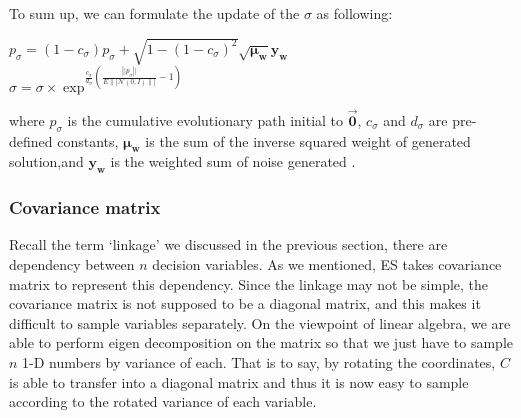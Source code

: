  To sum up, we can formulate the update of the $\sigma$ as following:\\
  \begin{center} {\large $p_{\sigma} =
    (1-c_{\sigma})p_{\sigma}+\sqrt{1-{\left(
      1-c_{\sigma}\right)}^2}\sqrt{\mathbf{\mu_w}}\mathbf{y_w}$\\
      $\sigma = \sigma \times \exp^{ \frac{c_{\sigma}}{d_{\sigma}}
      \left(\frac{\left|| p_{\sigma} \right||}{
        E\||{\mathcal{N}(0,I)}\||} -1 \right)  }$\\ } \end{center} where
      $p_{\sigma}$ is the cumulative evolutionary path initial to
      $\vec{\textbf{0}}$, $c_{\sigma}$ and $d_{\sigma}$ are pre-defined
      constants, $\mathbf{\mu_w}$ is the sum of the inverse squared
      weight of generated solution,and $\mathbf{y_w}$ is the weighted
      sum of noise generated .  \subsubsection{Covariance matrix} Recall
      the term `linkage' we discussed in the previous section, there are
      dependency between $n$ decision variables.  As we mentioned, ES
      takes covariance matrix to represent this dependency.  Since the
      linkage may not be simple, the covariance matrix is not supposed
      to be a diagonal matrix, and this makes it difficult to sample
      variables separately.  On the viewpoint of linear algebra, we are
      able to perform eigen decomposition on the matrix so that we just
      have to sample$n$ 1-D numbers by variance of each.  That is to
      say, by rotating the coordinates, $C$ is able to transfer into a
      diagonal matrix and thus it is now easy to sample according to the
      rotated variance of each variable.

